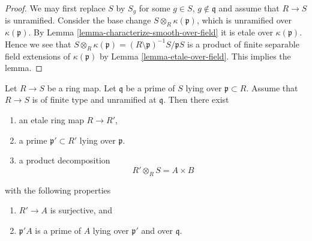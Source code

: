 \begin{proof}
We may first replace $S$ by $S_g$ for some $g \in S$, $g \not \in \mathfrak q$
and assume that $R \to S$ is unramified.
Consider the base change $S \otimes_R \kappa(\mathfrak p)$, which
is unramified over $\kappa(\mathfrak p)$.
By Lemma \ref{lemma-characterize-smooth-over-field} it is etale
over $\kappa(\mathfrak p)$.
Hence we see that
$S \otimes_R \kappa(\mathfrak p)
= (R \setminus \mathfrak p)^{-1} S/\mathfrak pS$
is a product of finite separable field extensions of
$\kappa(\mathfrak p)$ by Lemma \ref{lemma-etale-over-field}.
This implies the lemma.
\end{proof}

\begin{lemma}
\label{lemma-etale-makes-unramfied-closed-at-prime}
Let $R \to S$ be a ring map.
Let $\mathfrak q$ be a prime of $S$ lying over $\mathfrak p \subset R$.
Assume that $R \to S$ is of finite type and unramified at $\mathfrak q$.
Then there exist
\begin{enumerate}
\item an etale ring map $R \to R'$,
\item a prime $\mathfrak p' \subset R'$ lying over $\mathfrak p$.
\item a product decomposition
$$
R' \otimes_R S = A \times B
$$
\end{enumerate}
with the following properties
\begin{enumerate}
\item $R' \to A$ is surjective, and
\item $\mathfrak p'A$ is a prime of $A$ lying over $\mathfrak p'$ and
over $\mathfrak q$.
\end{enumerate}
\end{lemma}

